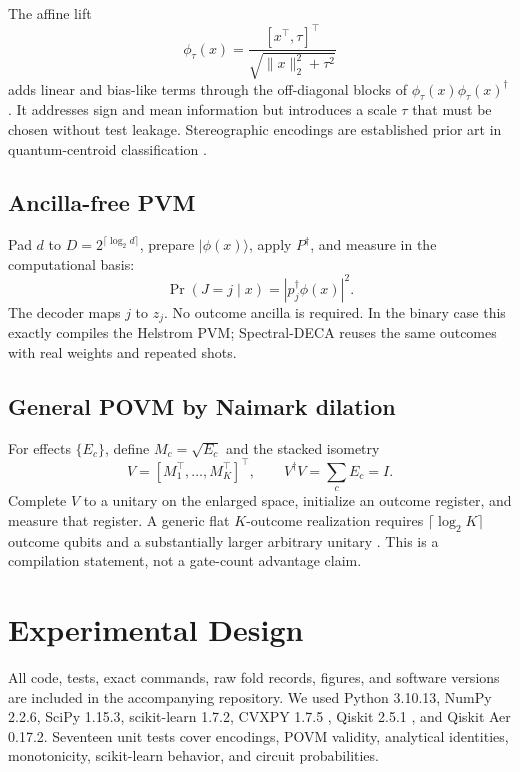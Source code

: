 \documentclass[10pt,twocolumn]{article}
\theoremstyle{definition}
\theoremstyle{remark}
\begin{document}
The affine lift
\begin{equation}
\phi_\tau(x)
=\frac{[x^\top,\tau]^\top}{\sqrt{\|x\|_2^2+\tau^2}}
\label{eq:affine}
\end{equation}
adds linear and bias-like terms through the off-diagonal blocks of
$\phi_\tau(x)\phi_\tau(x)^\dagger$.  It addresses sign and mean information
but introduces a scale $\tau$ that must be chosen without test leakage.
Stereographic encodings are established prior art in quantum-centroid
classification \cite{sergioli2019}.

\subsection{Ancilla-free PVM}

Pad $d$ to $D=2^{\lceil\log_2d\rceil}$, prepare
$|\phi(x)\rangle$, apply $P^\dagger$, and measure in the computational basis:
\begin{equation}
\Pr(J=j\mid x)=|p_j^\dagger\phi(x)|^2.
\end{equation}
The decoder maps $j$ to $z_j$.  No outcome ancilla is required.  In the binary
case this exactly compiles the Helstrom PVM; Spectral-DECA reuses the same
outcomes with real weights and repeated shots.

\subsection{General POVM by Naimark dilation}

For effects $\{E_c\}$, define $M_c=\sqrt{E_c}$ and the stacked isometry
\begin{equation}
V=[M_1^\top,\ldots,M_K^\top]^\top,\qquad
V^\dagger V=\sum_cE_c=I.
\end{equation}
Complete $V$ to a unitary on the enlarged space, initialize an outcome
register, and measure that register.  A generic flat $K$-outcome realization
requires $\lceil\log_2K\rceil$ outcome qubits and a substantially larger
arbitrary unitary \cite{naimark1940}.  This is a compilation statement, not a
gate-count advantage claim.

\section{Experimental Design}
\label{sec:experiments}

All code, tests, exact commands, raw fold records, figures, and software
versions are included in the accompanying repository.  We used Python
3.10.13, NumPy 2.2.6, SciPy 1.15.3, scikit-learn 1.7.2, CVXPY 1.7.5
\cite{diamond2016}, Qiskit 2.5.1 \cite{javadiabhari2024}, and Qiskit Aer
0.17.2.  Seventeen unit tests cover encodings, POVM validity, analytical
identities, monotonicity, scikit-learn behavior, and circuit probabilities.
\end{document}
